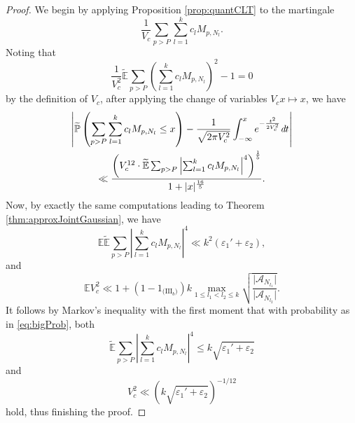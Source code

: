 \documentclass[11pt]{tran-l}
\theoremstyle{definition}
\theoremstyle{remark}
\numberwithin{equation}{section}
\begin{document}
\begin{proof}
    We begin by applying Proposition \ref{prop:quantCLT} to the martingale 
    \begin{equation*}
         \frac{1}{V_c}\sum_{p>P}\sum_{l=1}^k c_l M_{p, N_l}.
    \end{equation*} Noting that  
    \begin{equation*}
        \frac{1}{V_c^2}\widetilde{\mathbb E}\sum_{p>P}\left( \sum_{l=1}^k c_l M_{p, N_l}\right)^2-1=0
    \end{equation*} by the definition of $V_c$, after applying the change of variables $V_cx\mapsto x$, we have
    \begin{multline*}
        \left\lvert\widetilde{\mathbb P}\left(\sum_{p>P}\sum_{l=1}^k c_l M_{p, N_l}\leq x \right) - \frac{1}{\sqrt{2\pi V_c^2}}\int_{-\infty}^x e^{-\frac{t^2}{2V_c^2}}\emph{d}t\right \rvert \\ \ll \frac{\left(V_c^{12}\cdot \widetilde{\mathbb E}\sum_{p>P}\left\lvert \sum_{l=1}^k c_l M_{p, N_l}\right\rvert^4\right)^{\frac{1}{5}}}{1+\lvert x\rvert^{\frac{16}{5}}}.
    \end{multline*} 
    Now, by exactly the same computations leading to Theorem \ref{thm:approxJointGaussian}, we have 
    \begin{equation*}
        \mathbb E\widetilde{\mathbb E}\sum_{p>P}\left\lvert \sum_{l=1}^k c_l M_{p, N_l}\right\rvert^4\ll k^2(\varepsilon_1' + \varepsilon_2),
    \end{equation*} and 
    \begin{equation*}
        \mathbb EV_c^2 \ll 1 + (1-1_{\text{(III$_b$)}})k \max_{1\leq l_1<l_2\leq k} \sqrt{\frac{\lvert \mathcal A_{N_{l_1}}\rvert}{\lvert \mathcal A_{N_{l_2}}\rvert}}.
    \end{equation*}
        It follows by Markov's inequality with the first moment that with probability as in \eqref{eq:bigProb}, both 
        \begin{equation*}
            \widetilde{\mathbb E}\sum_{p>P}\left\lvert \sum_{l=1}^k c_l M_{p, N_l}\right\rvert^4 \leq k\sqrt{\varepsilon_1'+\varepsilon_2}\end{equation*} and \begin{equation*}
            V_c^2\ll \left(k\sqrt{\varepsilon_1' + \varepsilon_2}\right)^{-1/12}
        \end{equation*} hold, thus finishing the proof. 
\end{proof}
\end{document}
